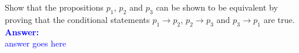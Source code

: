 \item{}
Show that the propositions $p_1$, $p_2$ and $p_3$ can be shown to be
equivalent by proving that the conditional statements $p_1\to p_2$, $p_2\to p_3$
and $p_3\to p_1$ are true.\\[12pt]
\ifanswers
\textcolor{blue}{
\textbf{Answer:}\\[6pt]
answer goes here
}
\newpage
\fi

